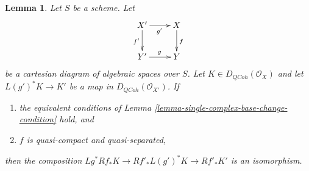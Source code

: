 \documentclass[10pt,a4paper]{amsart}
\theoremstyle{plain}
\newtheorem{lemma}[subsection]{Lemma}
\theoremstyle{definition}
\theoremstyle{remark}
\numberwithin{equation}{subsection}
\def\QCoh{\mathit{QCoh}}
\begin{document}
\begin{lemma}
\label{lemma-single-complex-base-change}
Let $S$ be a scheme. Let
$$
\xymatrix{
X' \ar[r]_{g'} \ar[d]_{f'} &
X \ar[d]^f \\
Y' \ar[r]^g &
Y
}
$$
be a cartesian diagram of algebraic spaces over $S$.
Let $K \in D_\QCoh(\mathcal{O}_X)$ and let $L(g')^*K \to K'$
be a map in $D_\QCoh(\mathcal{O}_{X'})$. If
\begin{enumerate}
\item the equivalent conditions of
Lemma \ref{lemma-single-complex-base-change-condition} hold, and
\item $f$ is quasi-compact and quasi-separated,
\end{enumerate}
then the composition $Lg^*Rf_*K \to Rf'_*L(g')^*K \to Rf'_*K'$
is an isomorphism.
\end{lemma}
\end{document}
